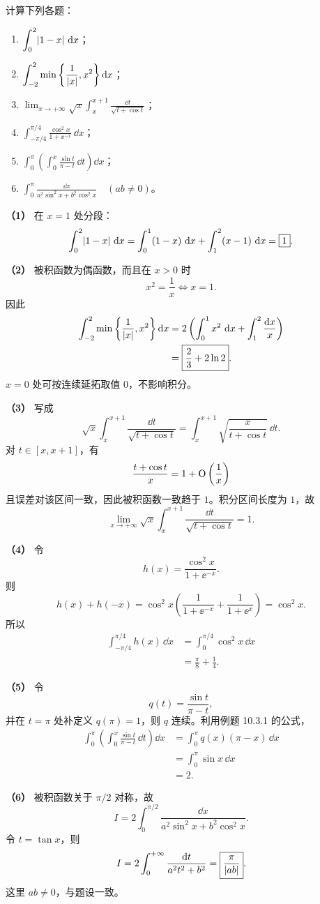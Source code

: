 \begin{xexercise}[2]
计算下列各题：
\begin{enumerate}[label=(\arabic*)]
  \item $\displaystyle\int_0^2\lvert1-x\rvert\,\mathop{}\!\mathrm{d} x$；
  \item $\displaystyle\int_{-2}^2\min\left\{\frac1{\lvert x\rvert},x^2\right\}\mathop{}\!\mathrm{d} x$；
  \item $\displaystyle\lim_{x\to+\infty}\sqrt{x}\int_x^{x+1}\frac{\dd t}{\sqrt{t+\cos t}}$；
  \item $\displaystyle\int_{-\pi/4}^{\pi/4}\frac{\cos^2x}{1+\ee^{-x}}\,\dd x$；
  \item $\displaystyle\int_0^\pi\left(\int_0^x\frac{\sin t}{\pi-t}\,\dd t\right)\dd x$；
  \item $\displaystyle\int_0^\pi\frac{\dd x}{a^2\sin^2x+b^2\cos^2x}\quad(ab\ne0)$。
\end{enumerate}
\end{xexercise}
\begin{xsolution}
\textbf{（1）}\quad
在 $x=1$ 处分段：
\[
  \int_0^2\lvert1-x\rvert\,\mathop{}\!\mathrm{d} x
  =\int_0^1(1-x)\,\mathop{}\!\mathrm{d} x+\int_1^2(x-1)\,\mathop{}\!\mathrm{d} x
  =\boxed{1}.
\]

\textbf{（2）}\quad
被积函数为偶函数，而且在 $x>0$ 时
\[
  x^2=\frac1x\Longleftrightarrow x=1.
\]
因此
\begin{align*}
  \int_{-2}^2\min\left\{\frac1{\lvert x\rvert},x^2\right\}\mathop{}\!\mathrm{d} x
  &=2\left(\int_0^1x^2\,\mathop{}\!\mathrm{d} x+\int_1^2\frac{\mathop{}\!\mathrm{d} x}{x}\right)\\
  &=\boxed{\frac23+2\ln2}.
\end{align*}
$x=0$ 处可按连续延拓取值 $0$，不影响积分。

\textbf{（3）}\quad
写成
\[
  \sqrt x\int_x^{x+1}\frac{\dd t}{\sqrt{t+\cos t}}
  =\int_x^{x+1}\sqrt{\frac{x}{t+\cos t}}\,\dd t.
\]
对 $t\in[x,x+1]$，有
\[
  \frac{t+\cos t}{x}=1+\mathrm{O}\left(\frac1x\right)
\]
且误差对该区间一致，因此被积函数一致趋于 $1$。积分区间长度为 $1$，故
\[
  \boxed{\lim_{x\to+\infty}\sqrt x\int_x^{x+1}
  \frac{\dd t}{\sqrt{t+\cos t}}=1}.
\]

\textbf{（4）}\quad
令
\[
  h(x)=\frac{\cos^2x}{1+\ee^{-x}}.
\]
则
\[
  h(x)+h(-x)
  =\cos^2x\left(\frac1{1+\ee^{-x}}+\frac1{1+\ee^x}\right)
  =\cos^2x.
\]
所以
\begin{align*}
  \int_{-\pi/4}^{\pi/4}h(x)\,\dd x
  &=\int_0^{\pi/4}\cos^2x\,\dd x\\
  &=\boxed{\frac\pi8+\frac14}.
\end{align*}

\textbf{（5）}\quad
令
\[
  q(t)=\frac{\sin t}{\pi-t},
\]
并在 $t=\pi$ 处补定义 $q(\pi)=1$，则 $q$ 连续。利用例题 10.3.1 的公式，
\begin{align*}
  \int_0^\pi\left(\int_0^x\frac{\sin t}{\pi-t}\,\dd t\right)\dd x
  &=\int_0^\pi q(x)(\pi-x)\,\dd x\\
  &=\int_0^\pi\sin x\,\dd x\\
  &=\boxed{2}.
\end{align*}

\textbf{（6）}\quad
被积函数关于 $\pi/2$ 对称，故
\[
  I=2\int_0^{\pi/2}\frac{\dd x}{a^2\sin^2x+b^2\cos^2x}.
\]
令 $t=\tan x$，则
\[
  I=2\int_0^{+\infty}\frac{\mathop{}\!\mathrm{d} t}{a^2t^2+b^2}
  =\boxed{\frac\pi{\lvert ab\rvert}}.
\]
这里 $ab\ne0$，与题设一致。
\end{xsolution}



